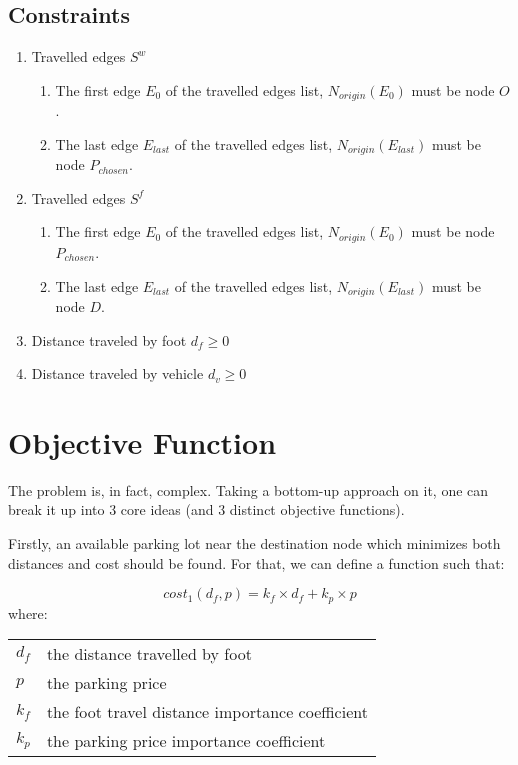 \documentclass[a4paper, 12pt]{report}
\makeatletter
\newenvironment{conditions}
  {\par\vspace{\abovedisplayskip}\noindent\begin{tabular}{>{$}l<{$} @{${}={}$} l}}
  {\end{tabular}\par\vspace{\belowdisplayskip}}
\makeatother
\begin{document}
    \subsection{Constraints}
    \begin{enumerate}
        \item Travelled edges $S^w$
        \begin{enumerate}
            \item The first edge $E_{0}$ of the travelled edges list, $N_{origin}(E_{0})$ must be node $O$.
            \item The last edge $E_{last}$ of the travelled edges list, $N_{origin}(E_{last})$ must be node $P_{chosen}$.
        \end{enumerate}
        \item Travelled edges $S^f$
        \begin{enumerate}
            \item The first edge $E_{0}$ of the travelled edges list, $N_{origin}(E_{0})$ must be node $P_{chosen}$.
            \item The last edge $E_{last}$ of the travelled edges list, $N_{origin}(E_{last})$ must be node $D$.
        \end{enumerate} 
        \item Distance traveled by foot $d_f \geqslant 0$
        \item Distance traveled by vehicle $d_v \geqslant 0$
    
    \end{enumerate}
    
    \pagebreak
    
    \section{Objective Function} \label{ofunc}

    The problem is, in fact, complex. Taking a bottom-up approach on it, one can break it up into 3 core ideas (and 3 distinct objective functions). 
    
    Firstly, an available parking lot near the destination node which minimizes both distances and cost should be found. For that, we can define a function such that:
    
    \begin{equation}
        cost_1(d_f, p) = k_f \times d_f + k_p \times p
    \end{equation}
    where:
    \begin{conditions}
        d_f     &  the distance travelled by foot \\
        p    &  the parking price \\   
        k_f  &  the foot travel distance importance coefficient  \\
        k_p       &  the parking price importance coefficient  \\
    \end{conditions}
    
\end{document}
